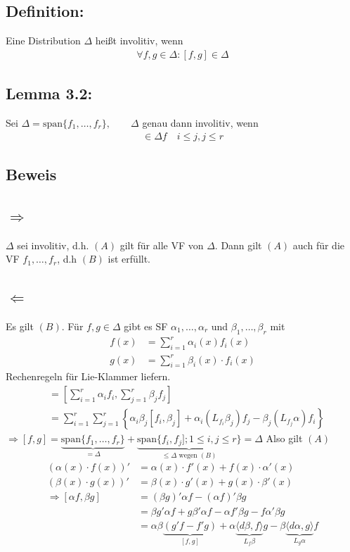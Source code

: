 \documentclass[ngerman]{tudscrreprt}
\begin{document}
\subsection*{Definition:}Eine Distribution $\Delta$ heißt involitiv, wenn 
\begin{align*}
\forall f,g \in \Delta: [f,g] \in \Delta \tag{A}
\end{align*}
\subsection*{Lemma 3.2:} Sei $\Delta = \text{span}\{f_1,\dots, f_r\},\qquad \Delta $ genau dann involitiv, wenn \begin{align*}
[f_i,g_j] \in \Delta f \quad i\le j , j\le r \tag{B}
\end{align*}
\subsection*{Beweis}
\subsection*{$\Rightarrow$}
 $\Delta$ sei involitiv, d.h. $(A)$ gilt für alle VF von $\Delta$. Dann gilt $(A)$ auch für die VF $f_1,\dots, f_r$, d.h $(B)$ ist erfüllt. 
\subsection*{$\Leftarrow$} Es gilt $(B)$. Für $f,g \in \Delta $ gibt es SF $\alpha_1,\dots,\alpha_r$ und $\beta_1,\dots,\beta_r$ mit
\begin{align*}
f(x) &=\sum\limits_{i=1}^{r} \alpha_i (x)f_i(x) \\ 
g(x) &=\sum\limits_{i=1}^{r} \beta_i(x)\cdot f_i(x)
\end{align*}
Rechenregeln für Lie-Klammer liefern. 
\begin{align*}
[f,g] &= \left[ \sum\limits_{i=1}^{r} \alpha_i f_i, \sum\limits_{j=1}^{r} \beta_j f_j \right]\\ 
&= \sum\limits_{i=1}^{r}\sum\limits_{j=1}^r\left\{ \alpha_i \beta_j [f_i, \beta_j] + \alpha_i (L_{f_i} \beta_j)f_j - \beta_j(L_{f_j} \alpha)f_i \right\}
\end{align*}
$\Rightarrow [f,g] = \underbrace{\text{span}\{ f_1, \dots, f_r \}}_{=\Delta} + \underbrace{\text{span}\{ f_i, f_j ]; 1\le i, j\le r \}}_{\le \Delta \text{ wegen } (B)} = \Delta$
Also gilt $(A)$
\begin{align*}
(\alpha(x)\cdot f(x))' &= \alpha(x)\cdot f'(x) + f(x)\cdot \alpha'(x)\\ 
(\beta(x)\cdot g(x))' &= \beta(x)\cdot g'(x) + g(x)\cdot \beta'(x) \\ 
\Rightarrow [\alpha f, \beta g] &= (\beta g)'\alpha f - (\alpha f)' \beta g \\ 
&= \beta g'\alpha f + g \beta'\alpha f - \alpha f' \beta g -f \alpha'\beta g \\ 
&= \alpha \beta \underbrace{(g'f - f'g)}_{[f,g]} + \alpha \underbrace{\langle d \beta, f \rangle}_{L_f \beta} g - \beta \underbrace{\langle d \alpha, g \rangle}_{L_g \alpha} f 
\end{align*}
\end{document}

